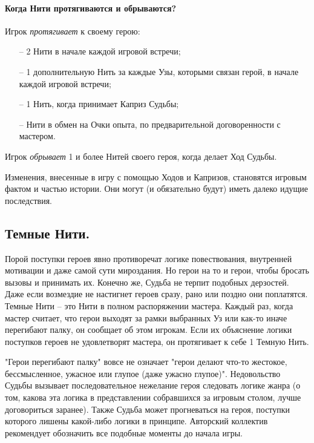 \paragraph{Когда Нити протягиваются и обрываются?}
Игрок \textit{протягивает} к своему герою:
\begin{itemize}
    \item[--] 2 Нити в начале каждой игровой встречи;
    \item[--] 1 дополнительную Нить за каждые Узы, которыми связан герой, в начале каждой игровой встречи;
    \item[--] 1 Нить, когда принимает Каприз Судьбы;
    \item[--] Нити в обмен на Очки опыта, по предварительной договоренности с мастером.
\end{itemize}
Игрок \textit{обрывает} 1 и более Нитей своего героя, когда делает Ход Судьбы.
\begin{tcolorbox}
Изменения, внесенные в игру с помощью Ходов и Капризов, становятся игровым фактом и частью истории. Они могут (и обязательно будут) иметь далеко идущие последствия.
\end{tcolorbox}

\subsection{Темные Нити.} 
Порой поступки героев явно противоречат логике повествования, внутренней мотивации и даже самой сути мироздания. Но герои на то и герои, чтобы бросать вызовы и принимать их. Конечно же, Судьба не терпит подобных дерзостей. Даже если возмездие не настигнет героев сразу, рано или поздно они поплатятся.
\newline Темные Нити – это Нити в полном распоряжении мастера. Каждый раз, когда мастер считает, что герои выходят за рамки выбранных Уз или как-то иначе перегибают палку, он сообщает об этом игрокам. Если их объяснение логики поступков героев не удовлетворят мастера, он протягивает к себе 1 Темную Нить. 
\begin{tcolorbox}
    "Герои перегибают палку" вовсе не означает "герои делают что-то жестокое, бессмысленное, ужасное или глупое (даже ужасно глупое)". Недовольство Судьбы вызывает последовательное нежелание героя следовать логике жанра (о том, какова эта логика в представлении собравшихся за игровым столом, лучше договориться заранее). Также Судьба может прогневаться на героя, поступки которого лишены какой-либо логики в принципе. Авторский коллектив рекомендует обозначить все подобные моменты до начала игры.
\end{tcolorbox}
